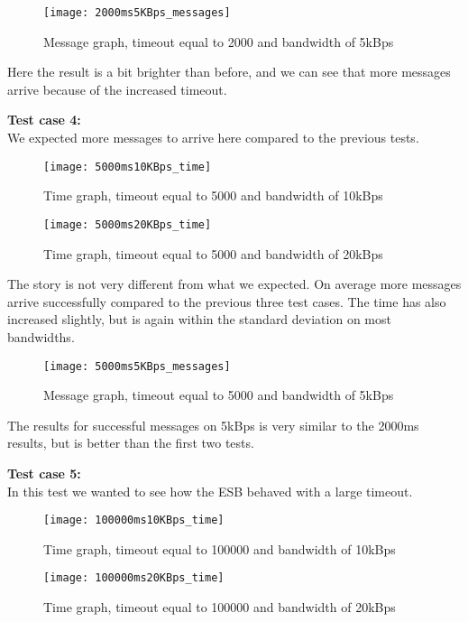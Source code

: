 	\begin{figure}[H]
		\centering
		\texttt{[image: 2000ms5KBps\_messages]}
		\caption{Message graph, timeout equal to 2000 and bandwidth of 5kBps} 
		\label{figure:results:2000ms5KBps_messages}
	\end{figure}
    Here the result is a bit brighter than before, and we can see that more messages arrive because of the increased timeout.
    
    \textbf{Test case 4:}\\
    We expected more messages to arrive here compared to the previous tests.
    \begin{figure}[H]
		\centering
		\texttt{[image: 5000ms10KBps\_time]}
		\caption{Time graph, timeout equal to 5000 and bandwidth of 10kBps} 
		\label{figure:results:5000ms10KBps_time}
	\end{figure}
	
	\begin{figure}[H]
		\centering
		\texttt{[image: 5000ms20KBps\_time]}
		\caption{Time graph, timeout equal to 5000 and bandwidth of 20kBps} 
		\label{figure:results:5000ms20KBps_time}
	\end{figure}
	
	The story is not very different from what we expected. On average more messages arrive successfully compared to the previous three test cases. The time has also increased slightly, but is again within the standard deviation on most bandwidths.
	
	\begin{figure}[H]
		\centering
		\texttt{[image: 5000ms5KBps\_messages]}
		\caption{Message graph, timeout equal to 5000 and bandwidth of 5kBps} 
		\label{figure:results:5000ms5KBps_messages}
	\end{figure}
	The results for successful messages on 5kBps is very similar to the 2000ms results, but is better than the first two tests.
    
    \textbf{Test case 5:}\\
    In this test we wanted to see how the ESB behaved with a large timeout.
    \begin{figure}[H]
		\centering
		\texttt{[image: 100000ms10KBps\_time]}
		\caption{Time graph, timeout equal to 100000 and bandwidth of 10kBps} 
		\label{figure:results:100000ms10KBps_time}
	\end{figure}
	
	\begin{figure}[H]
		\centering
		\texttt{[image: 100000ms20KBps\_time]}
		\caption{Time graph, timeout equal to 100000 and bandwidth of 20kBps} 
		\label{figure:results:100000ms20KBps_time}
	\end{figure}
	
